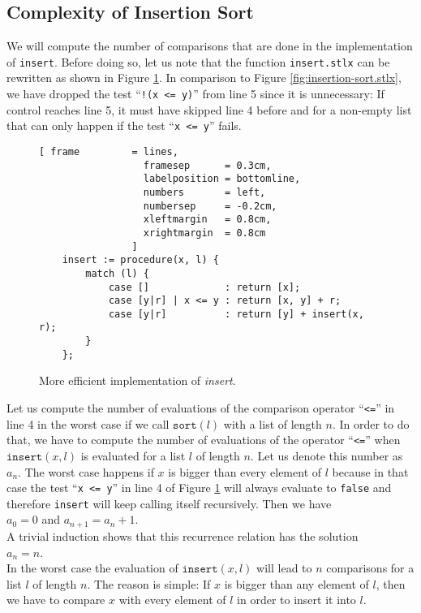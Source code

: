 \subsection{Complexity of Insertion Sort}
We will compute the number of comparisons that are done in the implementation of \texttt{insert}.
Before doing so, let us note that the function \texttt{insert.stlx} can be rewritten as shown in Figure
\ref{fig:insert.stlx}.  In comparison to Figure \ref{fig:insertion-sort.stlx}, we have dropped the
test ``\texttt{!(x <= y)}'' from line 5 since it is unnecessary:  If control reaches line 5, it must
have skipped line 4 before and for a non-empty list that can only happen if the test 
``\texttt{x <= y}'' fails.
\begin{figure}[!ht]
  \centering
\begin{Verbatim}[ frame         = lines, 
                  framesep      = 0.3cm, 
                  labelposition = bottomline,
                  numbers       = left,
                  numbersep     = -0.2cm,
                  xleftmargin   = 0.8cm,
                  xrightmargin  = 0.8cm
                ]
    insert := procedure(x, l) {
        match (l) {
            case []             : return [x];
            case [y|r] | x <= y : return [x, y] + r;
            case [y|r]          : return [y] + insert(x, r);
        }
    };
\end{Verbatim}
\vspace*{-0.3cm}
  \caption{More efficient implementation of \emph{insert}.}
  \label{fig:insert.stlx}
\end{figure} 

Let us compute the number of evaluations of the comparison operator ``\texttt{<=}'' in line 4 in the
worst case if we call $\texttt{sort}(l)$ with a list of length $n$. In order to do that, we have to
compute the number of evaluations of the operator ``\texttt{<=}'' when 
 $\texttt{insert}(x,l)$ is evaluated for a list $l$ of length $n$.  Let us denote this number as 
$a_n$.  The worst case happens if $x$ is bigger than every element of $l$ because in that case the
test ``\texttt{x <= y}'' in line 4 of Figure \ref{fig:insert.stlx} will always evaluate to
\texttt{false} and therefore \texttt{insert} will keep calling itself recursively.
Then we have
\\[0.2cm]
\hspace*{1.3cm}
$a_0 = 0$ \quad and \quad $a_{n+1} = a_n + 1$. 
\\[0.2cm]
A trivial induction shows that this recurrence relation has the solution
\\[0.2cm]
\hspace*{1.3cm} 
$a_n = n$.
\\[0.2cm]
In the worst case the evaluation of $\mathtt{insert}(x,l)$ will lead to $n$ comparisons for a list
$l$ of length $n$.  The reason is simple:  If $x$ is bigger than any element of $l$, then we have to
compare $x$ with every element of $l$ in order to insert it into $l$.

